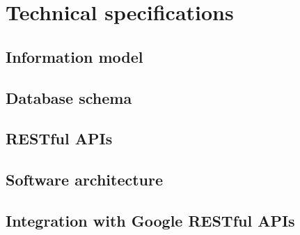 
\chapter{Technical specifications}
\section{Information model}
\section{Database schema}
\section{RESTful APIs}
\section{Software architecture}
\section{Integration with Google RESTful APIs}
